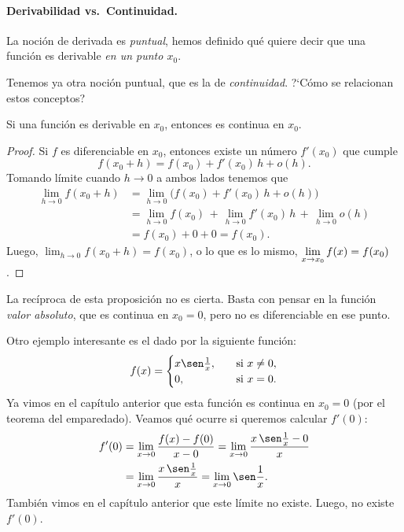 \paragraph{Derivabilidad vs.\ Continuidad.}

La noción de derivada es \emph{puntual}, hemos definido qué quiere decir que una función es derivable \emph{en un punto $x_0$}.

Tenemos ya otra noción puntual, que es la de \emph{continuidad}. ?`Cómo se relacionan estos conceptos?

\begin{proposition}
    Si una función es derivable en $x_0$, entonces es continua en $x_0$.
\end{proposition}

\begin{proof}
    Si $f$ es diferenciable en $x_0$, entonces existe un número $f'(x_0)$ que cumple
    \[
    f(x_0+h) = f(x_0) + f'(x_0) \, h + o(h).
    \]
    Tomando límite cuando $h\to0$ a ambos lados tenemos que
    \begin{align*}
    \lim_{h\to 0} f(x_0+h) 
    &= \lim_{h\to 0}\big(f(x_0) + f'(x_0) \, h + o(h)\big)
    \\
    &= \lim_{h\to 0}f(x_0) \,+\, \lim_{h\to 0}f'(x_0) \, h \,+\, \lim_{h\to 0}o(h)
    \\
    &= f(x_0)+0+0=f(x_0).
    \end{align*}
    Luego, $\lim_{h\to 0}f(x_0+h)=f(x_0)$, o lo que es lo mismo,
    $\displaystyle \lim_{x\to x_0}f(x)=f(x_0)$.
\end{proof}

La recíproca de esta proposición no es cierta. Basta con pensar en la función \emph{valor absoluto}, que es continua en $x_0=0$, pero no es diferenciable en ese punto.

\begin{example}
    Otro ejemplo interesante es el dado por la siguiente función:
    \[
    f(x) = \begin{cases} x \sen \frac1x,\quad&\text{si $x\neq 0$},
    \\
    0, \quad&\text{si $x=0$}.
    \end{cases}
    \]
    Ya vimos en el capítulo anterior que esta función es continua en $x_0=0$ (por el teorema del emparedado).
    Veamos qué ocurre si queremos calcular $f'(0)$:
    \begin{align*}
        f'(0) 
        &= \lim_{x\to 0} \frac{f(x)-f(0)}{x-0}
        = \lim_{x\to 0} \frac{x\,\sen\frac1x - 0}{x}
        \\
        &= \lim_{x\to 0} \frac{x\,\sen\frac1x}{x}
        = \lim_{x\to 0} \sen\frac1x.
    \end{align*}
    También vimos en el capítulo anterior que este límite no existe.
    Luego, no existe $f'(0)$.
\end{example}
